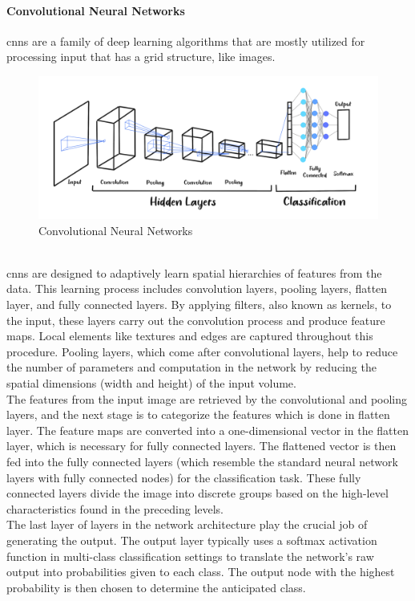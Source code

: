\paragraph{Convolutional Neural Networks}
\nocite{ibm_2023_what_cnn}
\nocite{mishra_2020_convolutional}
\nocite{mandal_2021_cnn}
\nocite{saha_2018_a}
\gls{cnns} are a family of deep learning algorithms that are mostly utilized for processing input that has a grid structure, like images. \citep{yamashita_2018_convolutional}
\\
\begin{figure}[!ht]
    \centering
    \includegraphics[width=16cm]{Images/cnns.png}
    \caption{Convolutional Neural Networks}
    \label{fig:cnns}
\end{figure}
\\
\indent \gls{cnns} are designed to adaptively learn spatial hierarchies of features from the data. 
This learning process includes convolution layers, pooling layers, flatten layer, and fully connected layers.
By applying filters, also known as kernels, to the input, these layers carry out the convolution process and produce feature maps. 
Local elements like textures and edges are captured throughout this procedure.
Pooling layers, which come after convolutional layers, help to reduce the number of parameters and computation in the network by reducing the spatial dimensions (width and height) of the input volume. 
\\
\indent The features from the input image are retrieved by the convolutional and pooling layers, and the next stage is to categorize the features which is done in flatten layer.
The feature maps are converted into a one-dimensional vector in the flatten layer, which is necessary for fully connected layers.
The flattened vector is then fed into the fully connected layers (which resemble the standard neural network layers with fully connected nodes) for the classification task. 
These fully connected layers divide the image into discrete groups based on the high-level characteristics found in the preceding levels.
\\
\indent The last layer of layers in the network architecture play the crucial job of generating the output.
The output layer typically uses a softmax activation function in multi-class classification settings to translate the network's raw output into probabilities given to each class. 
The output node with the highest probability is then chosen to determine the anticipated class.
\\
